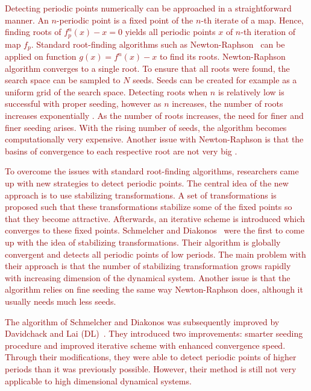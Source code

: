 \textcolor{darkred}{
Detecting periodic points numerically can be approached in a straightforward manner.
An $n$-periodic point is a fixed point of the $n$-th iterate of a map.
Hence, finding roots of $f^{n}_{p}(x)-x = 0$ yields all periodic points $x$ of $n$-th iteration of map $f_{p}$.
Standard root-finding algorithms such as Newton-Raphson~\cite{Haeseler1988} can be applied on function $g(x) = f^{n}(x)-x$ to find its roots.
Newton-Raphson algorithm converges to a single root. To ensure that all roots were found, the search space can be sampled to $N$ seeds.
Seeds can be created for example as a uniform grid of the search space.
Detecting roots when $n$ is relatively low is successful with proper seeding, however as $n$ increases, the number of roots increases exponentially \cite{Davidchack1999}.
As the number of roots increases, the need for finer and finer seeding arises.
With the rising number of seeds, the algorithm becomes computationally very expensive.
Another issue with Newton-Raphson is that the basins of convergence to each respective root are not very big \cite{Davidchack1999}.
}
\par
\textcolor{darkred}{
To overcome the issues with standard root-finding algorithms, researchers came up with new strategies to detect periodic points.
The central idea of the new approach is to use stabilizing transformations.
A set of transformations is proposed such that these transformations stabilize some of the fixed points so that they become attractive.
Afterwards, an iterative scheme is introduced which converges to these fixed points.
Schmelcher and Diakonos~\cite{Schmelcher1997,Pingel2000, Pingel2001} were the first to come up with the idea of stabilizing transformations.
Their algorithm is globally convergent and detects all periodic points of low periods.
The main problem with their approach is that the number of stabilizing transformation grows rapidly with increasing dimension of the dynamical system.
Another issue is that the algorithm relies on fine seeding the same way Newton-Raphson does, although it usually needs much less seeds.
}
\par
\textcolor{darkred}{
The algorithm of Schmelcher and Diakonos was subsequently improved by Davidchack and Lai (DL)~\cite{Davidchack1999, Davidchack2001, Klebanoff2001}.
They introduced two improvements: smarter seeding procedure and improved iterative scheme with enhanced convergence speed.
Through their modifications, they were able to detect periodic points of higher periods than it was previously possible.
However, their method is still not very applicable to high dimensional dynamical systems.
}

